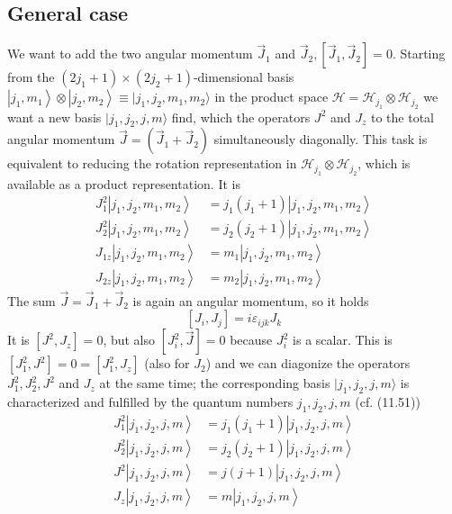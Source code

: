 \subsection{General case}
We want to add the two angular momentum $\vec{J}_1$ and $\vec{J}_{2},\left[\vec{J}_{1}, \vec{J}_{2}\right]=0$. Starting from the $\left(2 j_{1}+1\right) \times\left(2 j_{2}+1\right)$-dimensional basis $\left|j_{1}, m_{1}\right\rangle \otimes\left|j_{2}, m_{2}\right\rangle \equiv |j_1,j_2,m_1,m_2\rangle$ in the product space $\mathcal{H}=\mathcal{H}_{j_{1}} \otimes \mathcal{H}_{j_{2}}$ we want a new basis $| j_1, j_2 , j, m\rangle$ find, which the operators $J^2$ and $J_z$ to the total angular momentum $\vec{J}=\left(\vec{J}_{1}+\vec{J}_{2}\right)$ simultaneously diagonally. This task is equivalent to reducing the rotation representation in $\mathcal{H}_{j_{1}} \otimes \mathcal{H}_{j_{2}}$, which is available as a product representation. It is
\begin{equation}
\begin{aligned} J_{1}^{2}\left|j_{1}, j_{2}, m_{1}, m_{2}\right\rangle &= j_{1}\left(j_{1}+1\right)\left|j_{1}, j_{2}, m_{1}, m_{2}\right\rangle \\ J_{2}^{2}\left|j_{1}, j_{2}, m_{1}, m_{2}\right\rangle &= j_{2}\left(j_{2}+1\right)\left|j_{1}, j_{2}, m_{1}, m_{2}\right\rangle \\ J_{1 z}\left|j_{1}, j_{2}, m_{1}, m_{2}\right\rangle &= m_{1}\left|j_{1}, j_{2}, m_{1}, m_{2}\right\rangle \\ J_{2 z}\left|j_{1}, j_{2}, m_{1}, m_{2}\right\rangle &= m_{2}\left|j_{1}, j_{2}, m_{1}, m_{2}\right\rangle \end{aligned}
\end{equation}
The sum $\vec{J}=\vec{J}_{1}+\vec{J}_{2}$ is again an angular momentum, so it holds
\begin{equation}
    \left[J_{i}, J_{j}\right]=i \varepsilon_{i j k} J_{k}
    \end{equation}
It is $[J^2, J_z] = 0$, but also $[J^2_i, \vec{J}] = 0$ because $J^2_i$ is a scalar. This is $\left[J_{1}^{2}, J^{2}\right]=0=\left[J_{1}^{2}, J_{z}\right]$ (also for $J_2$) and we can diagonize the operators $J_1^2,J_2^2,J^2$ and $J_z$ at the same time; the corresponding basis $| j_1, j_2, j, m\rangle$ is characterized and fulfilled by the quantum numbers $j_1, j_2, j, m$ (cf. (11.51))
\begin{equation}
\begin{aligned} J_{1}^{2}\left|j_{1}, j_{2}, j, m\right\rangle &= j_{1}\left(j_{1}+1\right)\left|j_{1}, j_{2}, j, m\right\rangle \\ J_{2}^{2}\left|j_{1}, j_{2}, j, m\right\rangle &= j_{2}\left(j_{2}+1\right)\left|j_{1}, j_{2}, j, m\right\rangle \\ J^{2}\left|j_{1}, j_{2}, j, m\right\rangle &= j(j+1)\left|j_{1}, j_{2}, j, m\right\rangle \\ J_{z}\left|j_{1}, j_{2}, j, m\right\rangle &= m\left|j_{1}, j_{2}, j, m\right\rangle \end{aligned}
\end{equation}
